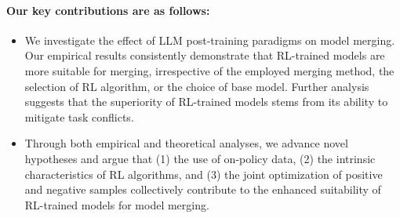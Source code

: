 \documentclass{article} %
\begin{document}
\paragraph{Our key contributions are as follows:}
\begin{itemize}
\item We investigate the effect of LLM post-training paradigms on model merging. Our empirical results consistently demonstrate that RL-trained models are more suitable for merging, irrespective of the employed merging method, the selection of RL algorithm, or the choice of base model. Further analysis suggests that the superiority of RL-trained models stems from its ability to mitigate task conflicts.



\item Through both empirical and theoretical analyses, we advance novel hypotheses and argue that (1) the use of on-policy data, (2) the intrinsic characteristics of RL algorithms, and (3) the joint optimization of positive and negative samples collectively contribute to the enhanced suitability of RL-trained models for model merging.

\end{itemize}


\end{document}
